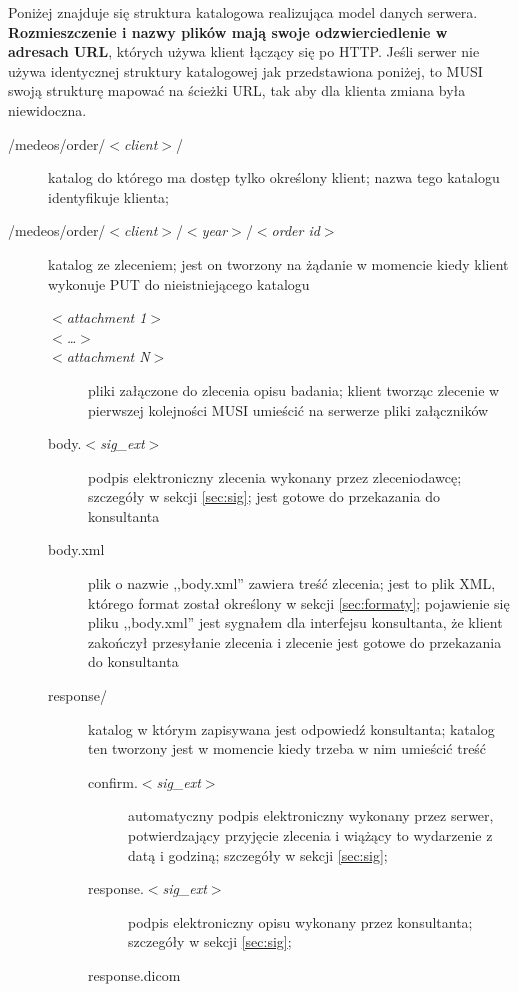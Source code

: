 \documentclass[a4paper]{article}
\begin{document}
Poniżej znajduje się struktura katalogowa realizująca model danych serwera.
\textbf{Rozmieszczenie i nazwy plików mają swoje odzwierciedlenie w adresach URL}, których
używa klient łączący się po HTTP. Jeśli serwer nie używa identycznej struktury
katalogowej jak przedstawiona poniżej, to MUSI swoją strukturę mapować na ścieżki URL,
tak aby dla klienta zmiana była niewidoczna.
\begin{description}
	\item[/medeos/order/$<$\textit{client}$>$/]
	katalog do którego ma dostęp tylko określony klient; nazwa tego katalogu identyfikuje
	klienta; 
	\item[/medeos/order/$<$\textit{client}$>$/$<$\emph{year}$>$/$<$\textit{order id}$>$]
	katalog ze zleceniem; jest on tworzony na żądanie w momencie kiedy klient wykonuje PUT
	do nieistniejącego katalogu
		\begin{description}
		\item[$<$\textit{attachment 1}$>$]   
		\item[$<$\textit{\ldots}$>$]   
		\item[$<$\textit{attachment N}$>$] pliki załączone do zlecenia opisu badania; klient
		tworząc zlecenie w pierwszej kolejności MUSI umieścić na serwerze pliki załączników
		\item[body.$<$\textit{sig\_ext}$>$] podpis elektroniczny zlecenia wykonany przez
		zleceniodawcę; szczegóły w sekcji \ref{sec:sig};
		jest gotowe do przekazania do konsultanta
		\item[body.xml] plik o nazwie ,,body.xml'' zawiera treść zlecenia; jest to plik XML,
		którego format został określony w sekcji \ref{sec:formaty}; pojawienie się pliku
		,,body.xml'' jest sygnałem dla interfejsu konsultanta, że klient zakończył przesyłanie
		zlecenia i zlecenie jest gotowe do przekazania do konsultanta
		\item[response/] katalog w którym zapisywana jest odpowiedź konsultanta; katalog ten
		tworzony jest w momencie kiedy trzeba w nim umieścić treść 
			\begin{description}
			\item[confirm.$<$\textit{sig\_ext}$>$]
			automatyczny podpis elektroniczny wykonany przez
			serwer, potwierdzający przyjęcie zlecenia i wiążący to wydarzenie z datą i
			godziną; szczegóły w sekcji \ref{sec:sig};
			\item[response.$<$\textit{sig\_ext}$>$]
			podpis elektroniczny opisu wykonany przez
			konsultanta; szczegóły w sekcji \ref{sec:sig};
			\item[response.dicom] 

\end{description}
\end{description}
\end{description}
\end{document}
